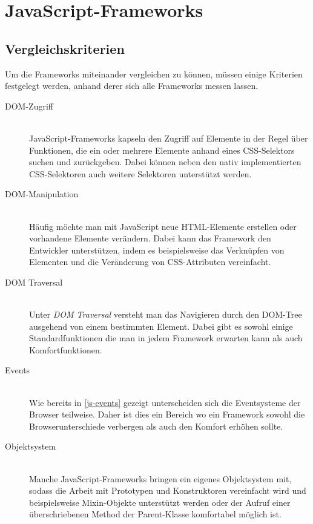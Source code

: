 \chapter{JavaScript-Frameworks}

\section{Vergleichskriterien}
Um die Frameworks miteinander vergleichen zu können, müssen einige Kriterien festgelegt werden,
anhand derer sich alle Frameworks messen lassen.

\begin{description}
\item[DOM-Zugriff] \hfill \\
JavaScript-Frameworks kapseln den Zugriff auf Elemente in der Regel über Funktionen, die ein oder
mehrere Elemente anhand eines CSS-Selektors suchen und zurückgeben. Dabei können neben den nativ
implementierten CSS-Selektoren auch weitere Selektoren unterstützt werden.

\item[DOM-Manipulation] \hfill \\
Häufig möchte man mit JavaScript neue HTML-Elemente erstellen oder vorhandene Elemente verändern.
Dabei kann das Framework den Entwickler unterstützen, indem es beispielsweise das Verknüpfen von
Elementen und die Veränderung von CSS-Attributen vereinfacht.

\item[DOM Traversal] \hfill \\
Unter \emph{DOM Traversal} versteht man das Navigieren durch den DOM-Tree ausgehend von einem
bestimmten Element. Dabei gibt es sowohl einige Standardfunktionen die man in jedem Framework
erwarten kann als auch Komfortfunktionen.

\item[Events] \hfill \\
Wie bereits in \autoref{js-events} gezeigt unterscheiden sich die Eventsysteme der Browser
teilweise. Daher ist dies ein Bereich wo ein Framework sowohl die Browserunterschiede verbergen als
auch den Komfort erhöhen sollte.

\item[Objektsystem] \hfill \\
Manche JavaScript-Frameworks bringen ein eigenes Objektsystem mit, sodass die Arbeit mit Prototypen
und Konstruktoren vereinfacht wird und beispielsweise Mixin-Objekte unterstützt werden oder der
Aufruf einer überschriebenen Method der Parent-Klasse komfortabel möglich ist.


\end{description}
